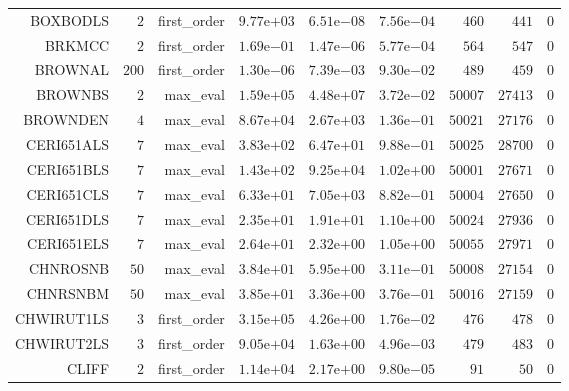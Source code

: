 \begin{longtable}{rrrrrrrrr}
BOXBODLS & \(     2\) & first\_order & \( 9.77\)e\(+03\) & \( 6.51\)e\(-08\) & \( 7.56\)e\(-04\) & \(   460\) & \(   441\) & \(     0\) \\
BRKMCC & \(     2\) & first\_order & \( 1.69\)e\(-01\) & \( 1.47\)e\(-06\) & \( 5.77\)e\(-04\) & \(   564\) & \(   547\) & \(     0\) \\
BROWNAL & \(   200\) & first\_order & \( 1.30\)e\(-06\) & \( 7.39\)e\(-03\) & \( 9.30\)e\(-02\) & \(   489\) & \(   459\) & \(     0\) \\
BROWNBS & \(     2\) & max\_eval & \( 1.59\)e\(+05\) & \( 4.48\)e\(+07\) & \( 3.72\)e\(-02\) & \( 50007\) & \( 27413\) & \(     0\) \\
BROWNDEN & \(     4\) & max\_eval & \( 8.67\)e\(+04\) & \( 2.67\)e\(+03\) & \( 1.36\)e\(-01\) & \( 50021\) & \( 27176\) & \(     0\) \\
CERI651ALS & \(     7\) & max\_eval & \( 3.83\)e\(+02\) & \( 6.47\)e\(+01\) & \( 9.88\)e\(-01\) & \( 50025\) & \( 28700\) & \(     0\) \\
CERI651BLS & \(     7\) & max\_eval & \( 1.43\)e\(+02\) & \( 9.25\)e\(+04\) & \( 1.02\)e\(+00\) & \( 50001\) & \( 27671\) & \(     0\) \\
CERI651CLS & \(     7\) & max\_eval & \( 6.33\)e\(+01\) & \( 7.05\)e\(+03\) & \( 8.82\)e\(-01\) & \( 50004\) & \( 27650\) & \(     0\) \\
CERI651DLS & \(     7\) & max\_eval & \( 2.35\)e\(+01\) & \( 1.91\)e\(+01\) & \( 1.10\)e\(+00\) & \( 50024\) & \( 27936\) & \(     0\) \\
CERI651ELS & \(     7\) & max\_eval & \( 2.64\)e\(+01\) & \( 2.32\)e\(+00\) & \( 1.05\)e\(+00\) & \( 50055\) & \( 27971\) & \(     0\) \\
CHNROSNB & \(    50\) & max\_eval & \( 3.84\)e\(+01\) & \( 5.95\)e\(+00\) & \( 3.11\)e\(-01\) & \( 50008\) & \( 27154\) & \(     0\) \\
CHNRSNBM & \(    50\) & max\_eval & \( 3.85\)e\(+01\) & \( 3.36\)e\(+00\) & \( 3.76\)e\(-01\) & \( 50016\) & \( 27159\) & \(     0\) \\
CHWIRUT1LS & \(     3\) & first\_order & \( 3.15\)e\(+05\) & \( 4.26\)e\(+00\) & \( 1.76\)e\(-02\) & \(   476\) & \(   478\) & \(     0\) \\
CHWIRUT2LS & \(     3\) & first\_order & \( 9.05\)e\(+04\) & \( 1.63\)e\(+00\) & \( 4.96\)e\(-03\) & \(   479\) & \(   483\) & \(     0\) \\
CLIFF & \(     2\) & first\_order & \( 1.14\)e\(+04\) & \( 2.17\)e\(+00\) & \( 9.80\)e\(-05\) & \(    91\) & \(    50\) & \(     0\) \\

\end{longtable}
